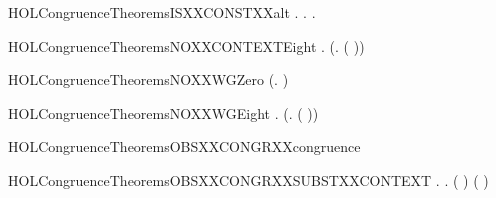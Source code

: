 \newcommand{\HOLCongruenceTheoremsGSEQXXstrongind}{\UseVerbatim{HOLCongruenceTheoremsGSEQXXstrongind}}
\begin{SaveVerbatim}{HOLCongruenceTheoremsISXXCONSTXXalt}
\HOLTokenTurnstile{} \HOLSymConst{\HOLTokenForall{}}.   \HOLSymConst{\HOLTokenEquiv{}} \HOLSymConst{\HOLTokenExists{}}. \HOLSymConst{\HOLTokenForall{}}.   \HOLSymConst{=} 
\end{SaveVerbatim}
\newcommand{\HOLCongruenceTheoremsISXXCONSTXXalt}{\UseVerbatim{HOLCongruenceTheoremsISXXCONSTXXalt}}
\begin{SaveVerbatim}{HOLCongruenceTheoremsNOXXCONTEXTEight}
\HOLTokenTurnstile{} \HOLSymConst{\HOLTokenForall{}} . \HOLSymConst{\HOLTokenNeg{}}  \HOLSymConst{\HOLTokenImp{}} \HOLSymConst{\HOLTokenNeg{}} (\HOLTokenLambda{}.   ( ))
\end{SaveVerbatim}
\newcommand{\HOLCongruenceTheoremsNOXXCONTEXTEight}{\UseVerbatim{HOLCongruenceTheoremsNOXXCONTEXTEight}}
\begin{SaveVerbatim}{HOLCongruenceTheoremsNOXXWGZero}
\HOLTokenTurnstile{} \HOLSymConst{\HOLTokenNeg{}} (\HOLTokenLambda{}. )
\end{SaveVerbatim}
\newcommand{\HOLCongruenceTheoremsNOXXWGZero}{\UseVerbatim{HOLCongruenceTheoremsNOXXWGZero}}
\begin{SaveVerbatim}{HOLCongruenceTheoremsNOXXWGEight}
\HOLTokenTurnstile{} \HOLSymConst{\HOLTokenForall{}} . \HOLSymConst{\HOLTokenNeg{}}  \HOLSymConst{\HOLTokenImp{}} \HOLSymConst{\HOLTokenNeg{}} (\HOLTokenLambda{}.   ( ))
\end{SaveVerbatim}
\newcommand{\HOLCongruenceTheoremsNOXXWGEight}{\UseVerbatim{HOLCongruenceTheoremsNOXXWGEight}}
\begin{SaveVerbatim}{HOLCongruenceTheoremsOBSXXCONGRXXcongruence}
\HOLTokenTurnstile{}  
\end{SaveVerbatim}
\newcommand{\HOLCongruenceTheoremsOBSXXCONGRXXcongruence}{\UseVerbatim{HOLCongruenceTheoremsOBSXXCONGRXXcongruence}}
\begin{SaveVerbatim}{HOLCongruenceTheoremsOBSXXCONGRXXSUBSTXXCONTEXT}
\HOLTokenTurnstile{} \HOLSymConst{\HOLTokenForall{}} .    \HOLSymConst{\HOLTokenImp{}} \HOLSymConst{\HOLTokenForall{}}.   \HOLSymConst{\HOLTokenImp{}}  ( ) ( )
\end{SaveVerbatim}
